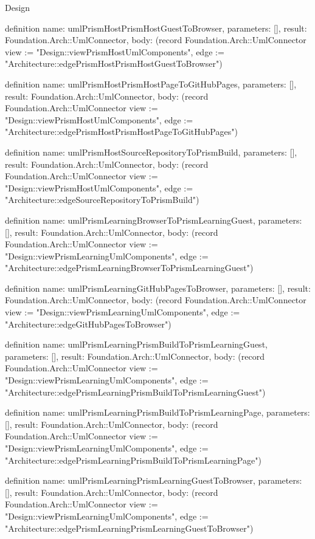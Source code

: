 \begin{lexlean}{Design}
\begin{semanticmodule}
definition{
  name: umlPrismHostPrismHostGuestToBrowser,
  parameters: [],
  result: Foundation.Arch::UmlConnector,
  body: (record Foundation.Arch::UmlConnector {view := "Design::viewPrismHostUmlComponents", edge := "Architecture::edgePrismHostPrismHostGuestToBrowser"})
}

definition{
  name: umlPrismHostPrismHostPageToGitHubPages,
  parameters: [],
  result: Foundation.Arch::UmlConnector,
  body: (record Foundation.Arch::UmlConnector {view := "Design::viewPrismHostUmlComponents", edge := "Architecture::edgePrismHostPrismHostPageToGitHubPages"})
}

definition{
  name: umlPrismHostSourceRepositoryToPrismBuild,
  parameters: [],
  result: Foundation.Arch::UmlConnector,
  body: (record Foundation.Arch::UmlConnector {view := "Design::viewPrismHostUmlComponents", edge := "Architecture::edgeSourceRepositoryToPrismBuild"})
}

definition{
  name: umlPrismLearningBrowserToPrismLearningGuest,
  parameters: [],
  result: Foundation.Arch::UmlConnector,
  body: (record Foundation.Arch::UmlConnector {view := "Design::viewPrismLearningUmlComponents", edge := "Architecture::edgePrismLearningBrowserToPrismLearningGuest"})
}

definition{
  name: umlPrismLearningGitHubPagesToBrowser,
  parameters: [],
  result: Foundation.Arch::UmlConnector,
  body: (record Foundation.Arch::UmlConnector {view := "Design::viewPrismLearningUmlComponents", edge := "Architecture::edgeGitHubPagesToBrowser"})
}

definition{
  name: umlPrismLearningPrismBuildToPrismLearningGuest,
  parameters: [],
  result: Foundation.Arch::UmlConnector,
  body: (record Foundation.Arch::UmlConnector {view := "Design::viewPrismLearningUmlComponents", edge := "Architecture::edgePrismLearningPrismBuildToPrismLearningGuest"})
}

definition{
  name: umlPrismLearningPrismBuildToPrismLearningPage,
  parameters: [],
  result: Foundation.Arch::UmlConnector,
  body: (record Foundation.Arch::UmlConnector {view := "Design::viewPrismLearningUmlComponents", edge := "Architecture::edgePrismLearningPrismBuildToPrismLearningPage"})
}

definition{
  name: umlPrismLearningPrismLearningGuestToBrowser,
  parameters: [],
  result: Foundation.Arch::UmlConnector,
  body: (record Foundation.Arch::UmlConnector {view := "Design::viewPrismLearningUmlComponents", edge := "Architecture::edgePrismLearningPrismLearningGuestToBrowser"})
}


\end{semanticmodule}
\end{lexlean}
